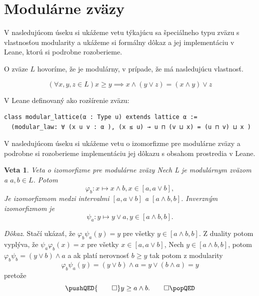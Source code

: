 \documentclass[a4paper,10pt,oneside]{report}%
\newtheorem{theorem}{Veta}[chapter]
\begin{document}
\section{Modulárne zväzy}

    V nasledujúcom úseku si ukážeme vetu týkajúcu sa špeciálneho typu zväzu s vlastnosťou
modularity a ukážeme si formálny dôkaz a jej implementáciu v Leane, ktorú si
podrobne rozoberieme.

    O zväze $L$ hovoríme, že je modulárny, v prípade, že má nasledujúcu vlastnosť.

\begin{equation*}
    (\forall x,y,z \in L) x \geq y \implies x \wedge ( y \vee z) = (x \wedge y) \vee z
\end{equation*}

    V Leane definovaný ako rozšírenie zväzu:

\begin{lstlisting}
class modular_lattice(α : Type u) extends lattice α :=
  (modular_law: ∀ (x u v : α ), (x ≤ u) → u ⊓ (v ⊔ x) = (u ⊓ v) ⊔ x )
\end{lstlisting}

    V nasledujúcom úseku si ukážeme vetu o izomorfizme pre modulárne zväzy a podrobne
si rozoberieme implementáciu jej dôkazu s obsahom prostredia v Leane.

\begin{theorem} \emph{Veta o izomorfizme pre modulárne zväzy}
Nech L je modulárnym zväzom a $a, b \in L$. Potom
    \begin{equation}
        \varphi_{b}: x \mapsto x \wedge b, x \in [a, a \vee b],
    \end{equation}
Je izomorfizmom medzi intervalmi $[a, a \vee b]$ a $[ a \wedge b, b]$.
Inverzným izomorfizmom je
    \begin{equation}
        \psi_{a}: y \mapsto y \vee a, y \in [a \wedge b, b].
    \end{equation}
\end{theorem}
\emph{Dôkaz}.
    Stačí ukázať, že $\varphi_{b}\psi_{a}(y) = y$ pre všetky $y \in [a \wedge b, b]$.
    Z duality potom vyplýva, že $\psi_{a}\varphi_{b}(x) = x$ pre všetky
$x \in [a, a \vee b ]$,
    Nech $y \in [ a \wedge b, b ]$, potom $\varphi_{b}\psi_{b} = ( y \vee b ) \wedge a$ 
a ak platí nerovnosť $b \geq y$ tak potom z modularity
    \begin{equation}
        \varphi_{b}\psi_{a}(y) =
        ( y \vee b ) \wedge a =
        y \vee ( b \wedge a) =
        y
    \end{equation}
    pretože
    \[
        \pushQED{\qed}
        y \geq a \wedge b. \qedhere
        \popQED
    \]
\end{document}
